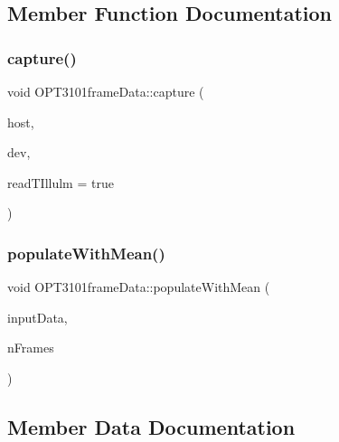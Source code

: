 \subsection{Member Function Documentation}
\mbox{\label{class_o_p_t3101frame_data_afe171f6c03686ece1a865029090e1df3}} 
\subsubsection{\texorpdfstring{capture()}{capture()}}
{\footnotesize\ttfamily void O\+P\+T3101frame\+Data\+::capture (\begin{DoxyParamCaption}\item[{\mbox{\hyperlink{classhost_controller}{host\+Controller}} $\ast$}]{host,  }\item[{\mbox{\hyperlink{class_o_p_t3101_1_1device}{O\+P\+T3101\+::device}} $\ast$}]{dev,  }\item[{bool}]{read\+T\+Illulm = {\ttfamily true} }\end{DoxyParamCaption})}

\mbox{\label{class_o_p_t3101frame_data_aaa94f04c355522bc236dc83bac043a1c}} 
\subsubsection{\texorpdfstring{populate\+With\+Mean()}{populateWithMean()}}
{\footnotesize\ttfamily void O\+P\+T3101frame\+Data\+::populate\+With\+Mean (\begin{DoxyParamCaption}\item[{\mbox{\hyperlink{class_o_p_t3101frame_data}{O\+P\+T3101frame\+Data}} $\ast$}]{input\+Data,  }\item[{uint16\+\_\+t}]{n\+Frames }\end{DoxyParamCaption})}



\subsection{Member Data Documentation}
\mbox{\label{class_o_p_t3101frame_data_a901d8630d15b79b558e7d7c5a9d08cc7}} 
